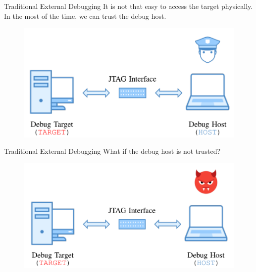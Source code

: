 \documentclass{beamer}
\begin{document}
\begin{frame}{Traditional External Debugging}
    It is not that easy to access the target physically. In the most of the time, we can trust the debug host.
    \begin{figure}
        \centering
        \includegraphics[scale=.40]{SUSTech-Beamer-Theme/pic/secure_external_debug.png}
        \label{fig:my_label}
    \end{figure}
\end{frame}

\begin{frame}{Traditional External Debugging}
    What if the debug host is not trusted?
    \begin{figure}
        \centering
        \includegraphics[scale=.40]{SUSTech-Beamer-Theme/pic/nonsecure_external_debug.png}
        \label{fig:my_label}
    \end{figure}
\end{frame}
\end{document}
